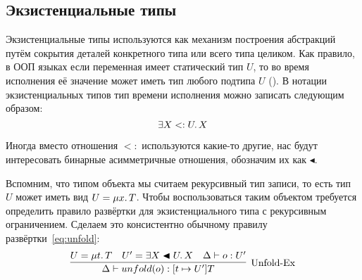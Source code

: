 \subsection{Экзистенциальные типы} \label{subsec:existentials}

Экзистенциальные типы используются как механизм построения абстракций путём сокрытия деталей конкретного типа или всего типа целиком.
Как правило, в ООП языках если переменная имеет статический тип $U$, то во время исполнения её значение может иметь тип любого подтипа $U$ ().
В нотации экзистенциальных типов тип времени исполнения можно записать следующим образом:
\[
    \exists X <: U \ldotp X
\]

Иногда вместо отношения $<:$ используются какие-то другие, нас будут интересовать бинарные асимметричные отношения, обозначим их как $\blacktriangleleft$.

Вспомним, что типом объекта мы считаем рекурсивный тип записи, то есть тип $U$ может иметь вид $U = \mu x \ldotp T$.
Чтобы воспользоваться таким объектом требуется определить правило развёртки для экзистенциального типа с рекурсивным ограничением.
Сделаем это консистентно обычному правилу развёртки~\eqref{eq:unfold}:
\begin{equation}
    \label{eq:unfold-ex}
    \infer[\text{Unfold-Ex}]{
        \Delta \vdash unfold(o) : [t \mapsto U']T
    }{
        U = \mu t \ldotp T
        &
        U' = \exists X \blacktriangleleft U \ldotp X
        &
        \Delta \vdash o : U'
    }
\end{equation}
